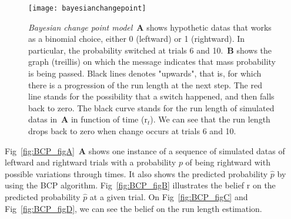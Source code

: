 \documentclass[profile,final,english, draft]{article}%
\newcommand{\seeFig}[1]{see Figure~\ref{fig:#1}}
\begin{document}
\begin{figure}%
\begin{center}
    \texttt{[image: bayesianchangepoint]}
\end{center}
\caption{\emph{Bayesian change point model}~\textbf{A} shows hypothetic datas that works as a binomial choice, either 0 (leftward) or 1 (rightward). In particular, the probability switched at trials 6 and 10.~\textbf{B} shows the graph (treillis) on which the message indicates that mass probability is being passed. Black lines denotes "upwards", that is, for which there is a progression of the run length at the next step. The red line stands for the possibility that a switch happened, and then falls back to zero. The black curve stands for the run length of simulated datas in~\textbf{A} in function of time (r$_t$). We can see that the run length drops back to zero when change occurs at trials 6 and 10.
}
\label{fig:bayesianchangepoint}
\end{figure}


Fig~\ref{fig:BCP_figA}~\textbf{A} shows one instance of a sequence of simulated datas of leftward and rightward trials with a probability $p$ of being rightward with possible variations through times. It also shows the predicted probability $\hat{p}$ by using the BCP algorithm. Fig~\ref{fig:BCP_figB} illustrates the belief r on the predicted probability $\hat{p}$ at a given trial. On Fig~\ref{fig:BCP_figC} and Fig~\ref{fig:BCP_figD}, we can see the belief on the run length estimation.
\end{document}
